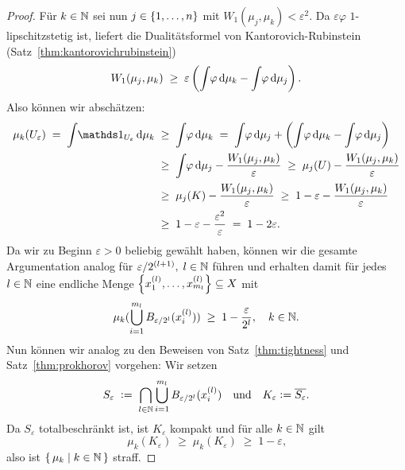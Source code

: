 \documentclass[../main/main.tex]{subfiles}
\begin{document}
\begin{proof}
		Für  $k \in \mathbb{N}$ sei nun $j \in \left\{1, \dots, n\right\}$ mit $W_1(\mu_j, \mu_k) < \varepsilon^2$. Da $\varepsilon\varphi$ $1$-lipschitzstetig ist, liefert die 
		Dualitätsformel von Kantorovich-Rubinstein (Satz~\ref{thm:kantorovichrubinstein})
		\[ W_1(\mu_j, \mu_k) \; \geq \; \varepsilon \left( \int_{} \, \varphi \, \mathrm{d}\mu_k - \int_{} \, \varphi \, \mathrm{d}\mu_j \right) \text{.} \]
		Also können wir abschätzen:
		\begin{align*}
			\mu_k(U_\varepsilon) \; = \; \measureint{}{\indfct_{U_\varepsilon}}{\mu_k} \; &\geq \; \measureint{}{\varphi}{\mu_k} \; = \; \measureint{}{\varphi}{\mu_j} + \left( \measureint{}{\varphi}{\mu_k} - \measureint{}{\varphi}{\mu_j} \right) \\
			                                                                              &\geq \; \measureint{}{\varphi}{\mu_j} - \frac{W_1(\mu_j, \mu_k)}{\varepsilon} \; \geq \; \mu_j(U) - \frac{W_1(\mu_j, \mu_k)}{\varepsilon} \\
			                                                                              &\geq \; \mu_j(K) - \frac{W_1(\mu_j, \mu_k)}{\varepsilon} \; \geq \; 1 - \varepsilon - \frac{W_1(\mu_j, \mu_k)}{\varepsilon} \\
			                                                                              &\geq \; 1 - \varepsilon - \frac{\varepsilon^2}{\varepsilon} \; = \; 1 - 2\varepsilon \text{.}
		\end{align*}
		Da wir zu Beginn $\varepsilon > 0$ beliebig gewählt haben, können wir die gesamte Argumentation analog für $\varepsilon/2^{(l+1)}, \; l \in \mathbb{N}$ führen und erhalten damit für jedes $l \in \mathbb{N}$ 
		eine endliche Menge $\left\{x_1^{(l)}, \dots, x_{m_l}^{(l)}\right\} \subseteq X$ mit
		\[ \mu_k(\bigcup_{i=1}^{m_l} B_{\varepsilon/2^l}(x_i^{(l)})) \; \geq \; 1 - \frac{\varepsilon}{2^l}, \quad k \in \mathbb{N} \text{.} \]
		Nun können wir analog zu den Beweisen von Satz~\ref{thm:tightness} und Satz~\ref{thm:prokhorov} vorgehen:
		Wir setzen
		\[ S_{\varepsilon} \; \vcentcolon = \; \bigcap_{l \in \mathbb{N}} \bigcup_{i=1}^{m_l} B_{\varepsilon/2^l}(x_i^{(l)}) \quad \text{und} \quad K_{\varepsilon} \vcentcolon = \overline{S_\varepsilon} \text{.} \]
		Da $S_{\varepsilon}$ totalbeschränkt ist, ist $K_{\varepsilon}$ kompakt und für alle $k \in \mathbb{N}$ gilt
		\[ \mu_k(K_{\varepsilon}) \; \geq \; \mu_k(K_{\varepsilon}) \; \geq \; 1 - \varepsilon \text{,} \]
		also ist $\left\{\, \mu_k \; \middle| \; k \in \mathbb{N} \,\right\}$ straff.
	\end{proof}
\end{document}
